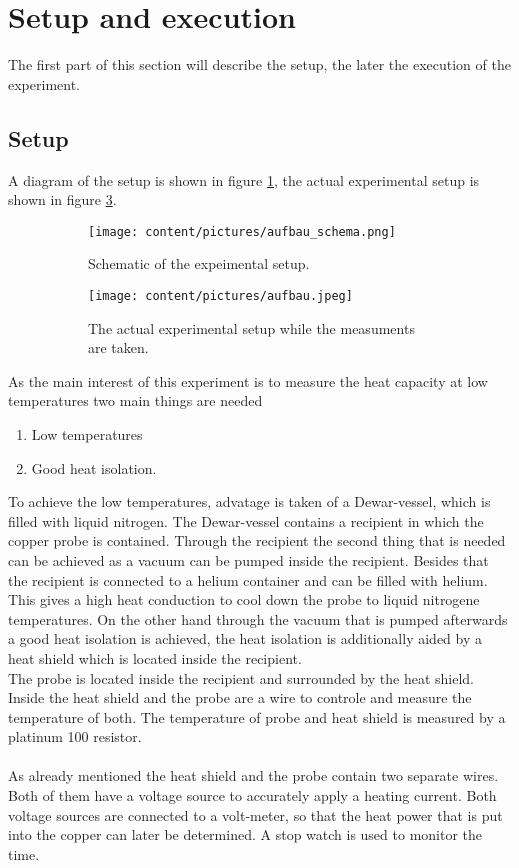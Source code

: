 \newpage
\section{Setup and execution}
\label{sec:durchfuerung}
The first part of this section will describe the setup, the later the execution of the experiment.
\subsection{Setup}
A diagram of the setup is shown in figure \ref{fig:setup_scheme}, the actual experimental setup is shown in figure \ref{fig:setup_actual}.
\begin{figure}
    \begin{subfigure}{0.48\textwidth}%
        \centering
        \texttt{[image: content/pictures/aufbau\_schema.png]}
        \caption{Schematic of the expeimental setup. \cite{anleitung}}
        \label{fig:setup_scheme}
    \end{subfigure}%
    \hfill
    \begin{subfigure}{0.48\textwidth}%
        \centering
        \texttt{[image: content/pictures/aufbau.jpeg]}
        \caption{The actual experimental setup while the measuments are taken.}
        \label{fig:setup_actual}
    \end{subfigure}
    \caption{}
\end{figure}
As the main interest of this experiment is to measure the heat capacity at low temperatures two main things are needed
\begin{enumerate}
    \item Low temperatures
    \item Good heat isolation.
\end{enumerate}
To achieve the low temperatures, advatage is taken of a Dewar-vessel, which is filled with liquid nitrogen.
The Dewar-vessel contains a recipient in which the copper probe is contained.
Through the recipient the second thing that is needed can be achieved as a vacuum can be pumped inside the recipient.
Besides that the recipient is connected to a helium container and can be filled with helium.
This gives a high heat conduction to cool down the probe to liquid nitrogene temperatures.
On the other hand through the vacuum that is pumped afterwards a good heat isolation is achieved, the heat isolation is additionally aided by a heat shield which is located inside the recipient.\\
The probe is located inside the recipient and surrounded by the heat shield. 
Inside the heat shield and the probe are a wire to controle and measure the temperature of both.
The temperature of probe and heat shield is measured by a platinum 100 resistor.\\\\
As already mentioned the heat shield and the probe contain two separate wires.
Both of them have a voltage source to accurately apply a heating current.
Both voltage sources are connected to a volt-meter, so that the heat power that is put into the copper can later be determined.
A stop watch is used to monitor the time.

